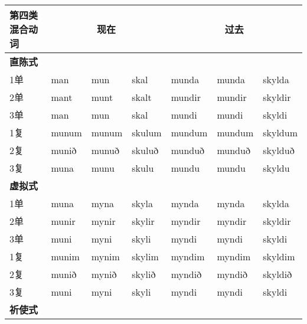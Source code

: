\begin{longtable}{lllllll}
    \toprule
    第四类混合动词  & \multicolumn{3}{c}{现在} & \multicolumn{3}{c}{过去}                                        \\
    \midrule
    \endhead
    \bottomrule
    \endfoot
    \textbf{直陈式} & ~                        & ~                        & ~        & ~      & ~      & ~       \\
    1单             & man                      & mun                      & skal     & munda  & munda  & skylda  \\
    2单             & mant                     & munt                     & skalt    & mundir & mundir & skyldir \\
    3单             & man                      & mun                      & skal     & mundi  & mundi  & skyldi  \\
    1复             & munum                    & munum                    & skulum   & mundum & mundum & skyldum \\
    2复             & munið                    & munuð                    & skuluð   & munduð & munduð & skylduð \\
    3复             & muna                     & munu                     & skulu    & mundu  & mundu  & skyldu  \\
    \textbf{虚拟式} & ~                        & ~                        & ~        & ~      & ~      & ~       \\
    1单             & muna                     & myna                     & skyla    & mynda  & mynda  & skylda  \\
    2单             & munir                    & mynir                    & skylir   & myndir & myndir & skyldir \\
    3单             & muni                     & myni                     & skyli    & myndi  & myndi  & skyldi  \\
    1复             & munim                    & mynim                    & skylim   & myndim & myndim & skyldim \\
    2复             & munið                    & mynið                    & skylið   & myndið & myndið & skyldið \\
    3复             & muni                     & myni                     & skyli    & myndi  & myndi  & skyldi  \\
    \textbf{祈使式} & ~                        & ~                        & ~        & ~      & ~      & ~       \\

\end{longtable}
